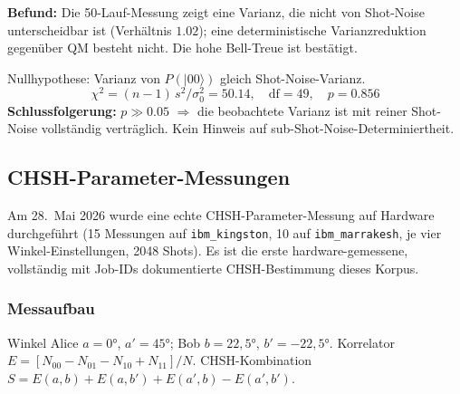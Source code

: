 \begin{important}
	\textbf{Befund:} Die 50-Lauf-Messung zeigt eine Varianz, die nicht von Shot-Noise unterscheidbar ist (Verhältnis $1.02$); eine deterministische Varianzreduktion gegenüber QM besteht nicht. Die hohe Bell-Treue ist bestätigt.
\end{important}

\begin{keyresult}
	Nullhypothese: Varianz von $P(|00\rangle)$ gleich Shot-Noise-Varianz.
	\begin{equation}
		\chi^2 = (n-1)\,s^2/\sigma_0^2 = 50.14, \quad \mathrm{df}=49, \quad p = 0.856
	\end{equation}
	\textbf{Schlussfolgerung:} $p \gg 0.05$ $\Rightarrow$ die beobachtete Varianz ist mit reiner Shot-Noise vollständig verträglich. Kein Hinweis auf sub-Shot-Noise-Determiniertheit.
\end{keyresult}

\subsection{CHSH-Parameter-Messungen}

Am 28.~Mai 2026 wurde eine echte CHSH-Parameter-Messung auf Hardware durchgeführt (15 Messungen auf \texttt{ibm\_kingston}, 10 auf \texttt{ibm\_marrakesh}, je vier Winkel-Einstellungen, 2048 Shots). Es ist die erste hardware-gemessene, vollständig mit Job-IDs dokumentierte CHSH-Bestimmung dieses Korpus.

\subsubsection{Messaufbau}

Winkel Alice $a=0°$, $a'=45°$; Bob $b=22{,}5°$, $b'=-22{,}5°$. Korrelator $E = [N_{00}-N_{01}-N_{10}+N_{11}]/N$. CHSH-Kombination $S = E(a,b)+E(a,b')+E(a',b)-E(a',b')$.

\begin{table}[h]
	\centering
	\caption{CHSH-Messung: Hardware-Ergebnisse (28.~Mai 2026)}
	\label{tab:chsh_real}
\end{table}

